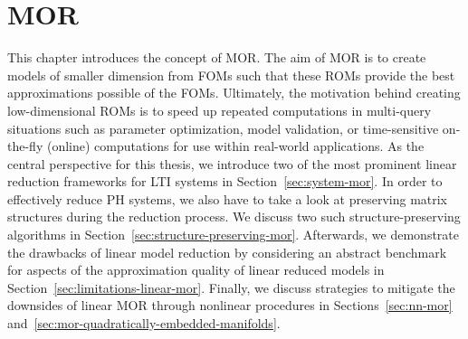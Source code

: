 \chapter{\acl{MOR}}\label{chap:linear-mor}

This chapter introduces the concept of \acf{MOR}.
The aim of MOR is to create models of smaller dimension from \acfp{FOM} such that these \acfp{ROM} provide the best approximations possible of the \acp{FOM}.
Ultimately, the motivation behind creating low-dimensional ROMs is to speed up repeated computations in multi-query situations such as parameter optimization, model validation, or time-sensitive on-the-fly (online) computations for use within real-world applications.
As the central perspective for this thesis, we introduce two of the most prominent linear reduction frameworks for \ac{LTI} systems in Section~\ref{sec:system-mor}.
In order to effectively reduce \ac{PH} systems, we also have to take a look at preserving matrix structures during the reduction process.
We discuss two such structure-preserving algorithms in Section~\ref{sec:structure-preserving-mor}.
Afterwards, we demonstrate the drawbacks of linear model reduction by considering an abstract benchmark for aspects of the approximation quality of linear reduced models in Section~\ref{sec:limitations-linear-mor}.
Finally, we discuss strategies to mitigate the downsides of linear \ac{MOR} through nonlinear procedures in Sections~\ref{sec:nn-mor} and~\ref{sec:mor-quadratically-embedded-manifolds}.






